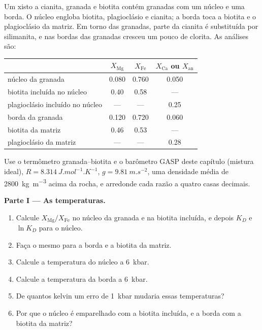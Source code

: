 \begin{problem}
\label{pb:b2:pt-paths:1}
Um xisto a cianita, granada e biotita contém granadas com um núcleo e uma borda. O núcleo engloba
biotita, plagioclásio e cianita; a borda toca a biotita e o plagioclásio da
matriz. Em torno das granadas, parte da cianita é substituída por silimanita, e nas bordas das
granadas cresceu um pouco de clorita. As análises são:
\begin{center}
\small
\begin{tabular}{@{}lccc@{}}
\hline
 & $X_{\text{Mg}}$ & $X_{\text{Fe}}$ & $X_{\text{Ca}}$ ou $X_{\text{an}}$\\
\hline
núcleo da granada & 0.080 & 0.760 & 0.050\\
biotita incluída no núcleo & 0.40 & 0.58 & ---\\
plagioclásio incluído no núcleo & --- & --- & 0.25\\
borda da granada & 0.120 & 0.720 & 0.060\\
biotita da matriz & 0.46 & 0.53 & ---\\
plagioclásio da matriz & --- & --- & 0.28\\
\hline
\end{tabular}
\end{center}
Use o termômetro granada--biotita e o barômetro GASP deste capítulo (mistura ideal),
$R = \qty{8.314}{J.mol^{-1}.K^{-1}}$, $g = \qty{9.81}{m.s^{-2}}$, uma densidade média de
\qty{2800}{kg.m^{-3}} acima da rocha, e arredonde cada razão a quatro casas decimais.

\noindent\textbf{Parte I --- As temperaturas.}
\begin{enumerate}
\item Calcule $X_{\text{Mg}}/X_{\text{Fe}}$ no núcleo da granada e na biotita
incluída, e depois $K_D$ e $\ln K_D$ para o núcleo.
\item Faça o mesmo para a borda e a biotita da matriz.
\item Calcule a temperatura do núcleo a \qty{6}{kbar}.
\item Calcule a temperatura da borda a \qty{6}{kbar}.
\item De quantos kelvin um erro de \qty{1}{kbar} mudaria essas temperaturas?
\item Por que o núcleo é emparelhado com a biotita incluída, e a borda com a biotita
da matriz?
\end{enumerate}


\end{problem}
